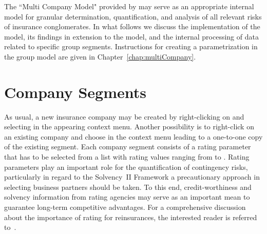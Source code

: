 The ``Multi Company Model" provided by \RA{} may serve as an appropriate internal model for
granular determination, quantification, and analysis of all relevant risks of insurance
conglomerates.  In what follows we discuss the implementation of the model, its findings in
extension to the \PODRA{} model, and the internal processing of data related to specific group
segments.  Instructions for creating a parametrization in the group model are given in
Chapter~\ref{chap:multiCompany}.





\section{Company Segments}\label{sec:companySegments}
As usual, a new insurance company may be created by right-clicking on  and
selecting  in the appearing context menu.
Another possibility is to right-click on an existing company and choose  in
the context menu leading to a one-to-one copy of the existing segment. Each company segment
consists of a rating parameter that has to be selected from a list with rating values
ranging from  to . Rating parameters play an important role for the
quantification of contingency risks, particularly in regard to the Solvency~II Framework
a precautionary approach in selecting business partners should be taken. To this end,
credit-worthiness and solvency information from rating agencies may serve as an important
mean to guarantee long-term competitive advantages. For a comprehensive discussion about
the importance of rating for reinsurances, the interested reader is referred
to~\cite{09:MunichReRating}.

